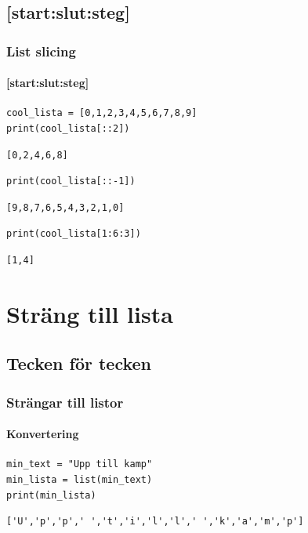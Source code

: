 \documentclass[aspectratio=169]{beamer}
\begin{document}
\subsection{[start:slut:steg]}

\begin{frame}[fragile]
	\frametitle{List slicing}
	\framesubtitle{[start:slut:steg]}
	
	\begin{lstlisting}
cool_lista = [0,1,2,3,4,5,6,7,8,9]
print(cool_lista[::2])
	\end{lstlisting}
	\begin{lstlisting}
[0,2,4,6,8]
	\end{lstlisting}
	
	\pause
	
	\begin{lstlisting}
print(cool_lista[::-1])
	\end{lstlisting}
	\begin{lstlisting}
[9,8,7,6,5,4,3,2,1,0]
	\end{lstlisting}
	
	\pause
	
	\begin{lstlisting}
print(cool_lista[1:6:3])
	\end{lstlisting}
	\begin{lstlisting}
[1,4]
	\end{lstlisting}
	

\end{frame}

\section{Sträng till lista}

\subsection{Tecken för tecken}

\begin{frame}[fragile]
	\frametitle{Strängar till listor}
	\framesubtitle{Konvertering}
	
	\begin{lstlisting}
min_text = "Upp till kamp"
min_lista = list(min_text)
print(min_lista)
	\end{lstlisting}
	\pause
	\begin{lstlisting}
['U','p','p',' ','t','i','l','l',' ','k','a','m','p']
	\end{lstlisting}
	
\end{frame}
\end{document}
